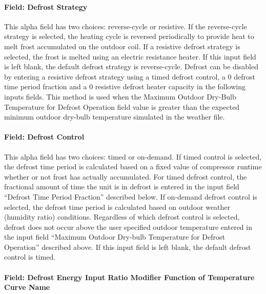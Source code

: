 \paragraph{Field: Defrost Strategy}\label{field-defrost-strategy-1-000}

This alpha field has two choices: reverse-cycle or resistive. If the reverse-cycle strategy is selected, the heating cycle is reversed periodically to provide heat to melt frost accumulated on the outdoor coil. If a resistive defrost strategy is selected, the frost is melted using an electric resistance heater. If this input field is left blank, the default defrost strategy is reverse-cycle. Defrost can be disabled by entering a resistive defrost strategy using a timed defrost control, a 0 defrost time period fraction and a 0 resistive defrost heater capacity in the following inputs fields. This method is used when the Maximum Outdoor Dry-Bulb Temperature for Defrost Operation field value is greater than the expected minimum outdoor dry-bulb temperature simulated in the weather file.

\paragraph{Field: Defrost Control}\label{field-defrost-control-1-000}

This alpha field has two choices: timed or on-demand. If timed control is selected, the defrost time period is calculated based on a fixed value of compressor runtime whether or not frost has actually accumulated. For timed defrost control, the fractional amount of time the unit is in defrost is entered in the input field ``Defrost Time Period Fraction'' described below. If on-demand defrost control is selected, the defrost time period is calculated based on outdoor weather (humidity ratio) conditions. Regardless of which defrost control is selected, defrost does not occur above the user specified outdoor temperature entered in the input field ``Maximum Outdoor Dry-bulb Temperature for Defrost Operation'' described above. If this input field is left blank, the default defrost control is timed.

\paragraph{Field: Defrost Energy Input Ratio Modifier Function of Temperature Curve Name}\label{field-defrost-energy-input-ratio-modifier-function-of-temperature-curve-name-1}

